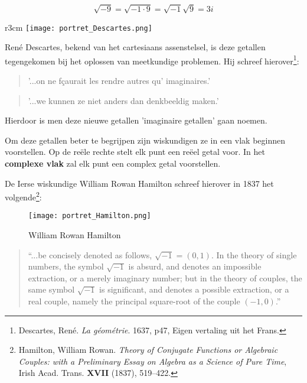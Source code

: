 \documentclass{ximera}
\begin{document}
\[ \sqrt{-9} = \sqrt{-1 \cdot 9} = \sqrt{-1} \sqrt{9} = 3i  \]


\begin{wrapfigure}{r}{3cm} 
    \texttt{[image: portret\_Descartes.png]}
\end{wrapfigure}

René Descartes, bekend van het cartesiaans assenstelsel, is deze getallen tegengekomen bij het oplossen van meetkundige problemen. Hij schreef hierover\footnote{
    Descartes, René. \textit{La géométrie}. 1637, p47, Eigen vertaling uit het Frans.
    }: 
    
    
    
    
    \begin{quote}
        '...on ne fçaurait les rendre autres qu’ imaginaires.' 
    \end{quote}
    
    \begin{quote}
        '...we kunnen ze niet anders dan denkbeeldig maken.'
    \end{quote}
    
    
    Hierdoor is men deze nieuwe getallen 'imaginaire getallen' gaan noemen. 
    
    \newpage
    
    Om deze getallen beter te begrijpen zijn wiskundigen ze in een vlak beginnen voorstellen. Op de reële rechte stelt elk punt een reëel getal voor. In het \textbf{complexe vlak} zal elk punt een complex getal voorstellen. 
    
    
    
    De Ierse wiskundige William Rowan Hamilton schreef hierover in 1837 het volgende\footnote{
        Hamilton, William Rowan. \textit{Theory of Conjugate Functions or Algebraic
        Couples: with a Preliminary Essay on Algebra as a Science of Pure
        Time}, Irish Acad. Trans. \textbf{XVII} (1837), 519–422.}:   
    \begin{figure}[H]
        \centering
        \texttt{[image: portret\_Hamilton.png]}
        \caption{William Rowan Hamilton}
    \end{figure}

    \begin{quote}
        “...be concisely denoted as follows, \(\sqrt{-1} = (0, 1)\). In the theory of single numbers, the symbol \(\sqrt{-1}\) is absurd, and denotes an impossible extraction, or a merely imaginary number; but in the theory of couples, the same symbol \(\sqrt{-1}\) is significant, and denotes a possible extraction, or a real couple, namely the principal square-root of the couple \((-1,0)\).”
    \end{quote}
    
\end{document}
